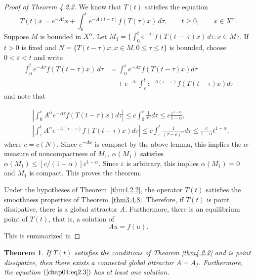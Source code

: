 \documentclass{surv-l}
\theoremstyle{plain}
\newtheorem{theorem}{Theorem}[section]
\theoremstyle{definition}
\numberwithin{equation}{section}
\numberwithin{figure}{chapter}
\begin{document}
\begin{proof}[Proof of Theorem 4.2.2]\label{pot4.2.2}
We know that $T(t)$ satisfies the equation
\begin{equation*}
T(t)x=e^{-At}x+\int_{0}^{t}e^{-A(t-\tau)}f(T(\tau)x)\, d\tau,\qquad t\geq 0,\qquad x\in X^{\alpha}.
\end{equation*}
Suppose $M$ is bounded in $X^{\alpha}$. Let
$M_{1}= \{\int_{0}^{t}e^{-A\tau}f(T(t\,-\,\tau)x)\,d\tau\!:x\in M\}$. If $t>0$ is fixed and $N=\{T(t-\tau)x, x\in M, 0\leq\tau\leq t\}$ is bounded, choose $ 0<\varepsilon <t$ and write
\begin{align*}
\int_{0}^{t}e^{-A\tau}f(T(t-\tau)x)\,d\tau&=\int_{0}^{\varepsilon}e^{-A\tau}f(T(t-\tau)x)d\tau\\
&\quad +e^{-A\varepsilon}\int_{\varepsilon}^{t}e^{-A(\tau-\varepsilon)}f(T(t-\tau)x)d\tau
\end{align*}
and note that

\begin{align*}
&\left|\int_{0}^{\varepsilon}A^{\alpha}e^{-A\tau}f(T(t-\tau)x)d\tau\right|\leq c\int_{0}^{\varepsilon}\frac{1}{\tau^{\alpha}}d\tau\leq c\frac{\varepsilon^{1-\alpha}}{1-\alpha},\\
&\left|\int_{\varepsilon}^{t}A^{\alpha}e^{-A(\tau-\varepsilon)}f(T(t-\tau)x)d\tau\right|\leq c\int_{\varepsilon}^{t}\frac{1}{(\tau-\varepsilon)^{\alpha}}d\tau\leq\frac{c}{1-\alpha}t^{1-\alpha},
\end{align*}
where $c=c(N)$. Since $e^{-A\varepsilon}$ is compact by the above lemma, this implies the $\alpha$-measure of noncompactness of $M_{1},\ \alpha(M_{1})$ satisfies $\alpha(M_{1})\leq[c/(1-\alpha)]\varepsilon^{1-\alpha}$. Since $\varepsilon$ is arbitrary, this implies $\alpha(M_{1})=0$ and $M_{1}$ is compact. This proves the theorem.

Under the hypotheses of Theorem~\ref{thm4.2.2}, the operator $T(t)$ satisfies the smoothness properties of Theorem~\ref{thm3.4.8}. Therefore, if $T(t)$ is point dissipative, there is a global attractor \emph{A}. Furthermore, there is an equilibrium point of $T(t)$, that is, a solution of
\begin{equation}\label{chap04:eq2.3}
Au=f(u).
\end{equation}
This is summarized in
\end{proof}

\begin{theorem}\label{thm4.2.4}
If $T(t)$ satisfies the conditions of Theorem \ref{thm4.2.2} and is
point dissipative, then there exists a connected global attractor $A=A_{f}$. Furthermore, the equation $(\ref{chap04:eq2.3})$ has at least one solution.
\end{theorem}
\end{document}
